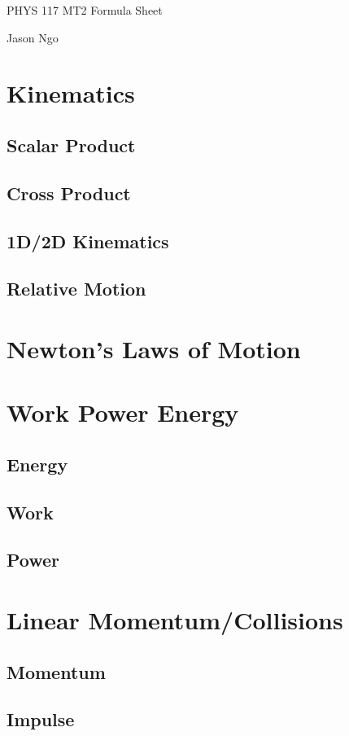 \documentclass[letterpaper]{article}
\begin{document}
PHYS 117 MT2 Formula Sheet

Jason Ngo

\section{Kinematics}
\subsection{Scalar Product}
\subsection{Cross Product}
\subsection{1D/2D Kinematics}
\subsection{Relative Motion}

\section{Newton's Laws of Motion}

\section{Work Power Energy}
\subsection{Energy}
\subsection{Work}
\subsection{Power}

\section{Linear Momentum/Collisions}
\subsection{Momentum}
\subsection{Impulse}
\end{document}
